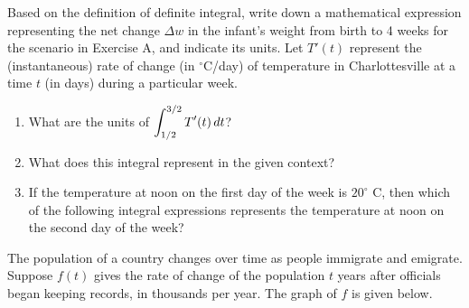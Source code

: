 \documentclass[10pt]{article}
\begin{document}
\example Based on the definition of definite integral, write down a mathematical expression representing the net change $\Delta w$ in the infant's weight from birth to 4 weeks for the scenario in Exercise A, and indicate its units.
\exercise{} Let $T'(t)$ represent the (instantaneous) rate of change (in $^{\circ}$C/day) of temperature in Charlottesville at a time $t$ (in days) during a particular week. 

\begin{enumerate}
\item[(a)] What are the units of $\displaystyle \int_{1/2}^{3/2} T'(t)\,dt$? 

\item[(b)] What does this integral represent in the given context?


\item[(c)] \pe If the temperature at noon on the first day of the week is $20^{\circ}$ C, then which of the following integral expressions represents the temperature at noon on the second day of the week?
\end{enumerate}

\newpage
{\exercise} The population of a country changes over time as people immigrate and emigrate. Suppose $f(t)$ gives the rate of change of the population $t$ years after officials began keeping records, in thousands per year. The graph of $f$ is given below.\\
\end{document}
